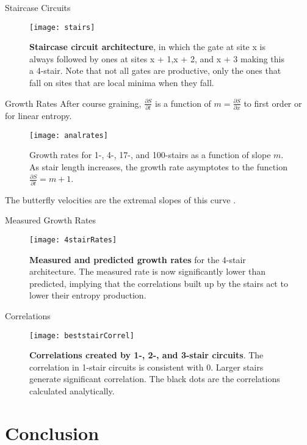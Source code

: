 \documentclass{beamer}
\newcommand{\pd}[2]{\frac{\partial #1}{\partial #2}}
\begin{document}
\begin{frame}{Staircase Circuits}
\begin{figure}
	\centering
	\texttt{[image: stairs]}
	\caption{\textbf{Staircase circuit architecture}, in which the gate at site x is always followed by ones at sites x + 1,x + 2, and x + 3 making this a 4-stair. Note that not all gates are productive, only the ones that fall on sites that are local minima when they fall.}
	\label{fig:stair}
\end{figure}
\end{frame}

\begin{frame}{Growth Rates}
After course graining, $\pd{S}{t}$ is a function of $m = \pd{S}{x}$ to first order or for linear entropy.
\begin{figure}
\centering
\texttt{[image: analrates]}
\caption{Growth rates for 1-, 4-, 17-, and 100-stairs as a function of slope $m$. As stair length increases, the growth rate asymptotes to the function $\pd{S}{t} = m+1$.}
\label{fig:growthrates}
\end{figure}
The butterfly velocities are the extremal slopes of this curve \cite{Jonay18}.
\end{frame}

\begin{frame}{Measured Growth Rates}
\begin{figure}
	\centering
	\texttt{[image: 4stairRates]}
	\caption{\textbf{Measured and predicted growth rates} for the 4-stair architecture. The measured rate is now significantly lower than predicted, implying that the correlations built up by the stairs act to lower their entropy production.}
	\label{fig:4stairRates}
\end{figure}
\end{frame}

\begin{frame}{Correlations}
\begin{figure}
	\centering
	\texttt{[image: beststairCorrel]}
	\caption{\textbf{Correlations created by 1-, 2-, and 3-stair circuits}. The correlation in 1-stair circuits is consistent with 0. Larger stairs generate significant correlation. The black dots are the correlations calculated analytically.}
	\label{fig:beststairCorrel}
\end{figure}
\end{frame}

\section{Conclusion}
\end{document}
